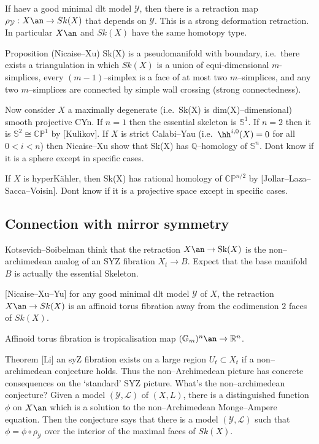 If haev a good minimal dlt model \(\mathcal{Y}\), then there is a retraction map
\(\rho_\mathcal{Y}: X\an\to Sk(X)\) that depends on \(\mathcal{Y}\). This is a
strong deformation retraction. In
particular \(X\an\) and \(Sk(X)\) have the same homotopy type.

Proposition (Nicaise--Xu) Sk(X) is a pseudomanifold with boundary, i.e.\ there
exists a triangulation in which \(Sk(X)\) is a union of equi-dimensional
\(m\)-simplices, every \((m-1)\)--simplex is a face of at most two
\(m\)--simplices, and any two \(m\)--simplices are connected by simple wall
crossing (strong connectedness).



Now consider \(X\) a maximally degenerate (i.e.\ Sk(X) is dim(X)--dimensional)
smooth projective CYn.
If \(n=1\) then the essential skeleton is \(\mathbb{S}^1\). If \(n=2\) then it
is \(\mathbb{S}^2\cong \mathbb{CP}^1\) by [Kulikov]. If \(X\) is strict
Calabi--Yau (i.e.\ \(\hh^{i,0}(X)=0\) for all \(0<i<n\)) then Nicaise--Xu show
that Sk(X) has \(\mathbb{Q}\)--homology of \(\mathbb{S}^n\). Dont know if it is
a sphere except in specific cases.

If \(X\) is hyperK\"ahler, then Sk(X) has rational homology of
\(\mathbb{CP}^{n/2}\) by [Jollar--Laza--Sacca--Voisin]. Dont know if it is
a projective space except in specific cases.

\subsection{Connection with mirror symmetry} Kotsevich--Soibelman think that the
retraction \(X\an\to \text{Sk}(X)\) is the non--archimedean analog of an SYZ
fibration \(X_t\to B\). Expect that the base manifold \(B\) is actually the
essential Skeleton.

[Nicaise--Xu--Yu] for any good minimal dlt model \(\mathcal{Y}\) of \(X\),
the retraction \(X\an\to Sk(X)\) is an affinoid torus fibration away from the
codimension \(2\) faces of \(Sk(X)\).

Affinoid torus fibration is tropicalisation map \((\mathbb{G}_m)^n\an\to \mathbb{R}^n\).

Theorem [Li] an syZ fibration exists on a large region \(U_t\subset X_t\) if a
non--archimedean conjecture holds. Thus the non--Archimedean picture has
concrete consequences on the `standard' SYZ picture. What's the
non--archimedean conjecture? Given a model \((\mathcal{Y},\mathcal{L})\) of
\((X,L)\), there is a distinguished function \(\phi\) on \(X\an\) which is a
solution to the non--Archimedean Monge--Ampere equation. Then the conjecture
says that there is a model \((\mathcal{Y},\mathcal{L})\) such that \(\phi =
\phi\circ \rho_\mathcal{Y}\) over the interior of the maximal faces of
\(Sk(X)\).




